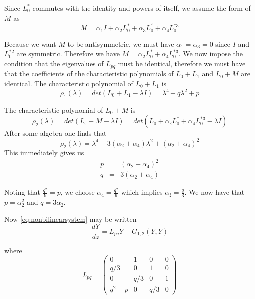 Since $L_0^*$ commutes with the identity and powers of itself, we assume the form of $M$ as
\begin{equation}
M = \alpha_1 I + \alpha_2 L_0^* + \alpha_3 L_0^{^2} + \alpha_4 L_0^{*3}
\end{equation}

Because we want $M$ to be antisymmetric, we must have $\alpha_1=\alpha_3=0$ since $I$ and $L_0^{*2}$ are symmetric.
Therefore we have $ M = \alpha_2 L_0^* + \alpha_4 L_0^{*3} $. We now impose the condition that the eigenvalues of $L_{pq}$
must be identical, therefore we must have that the coefficients of the characteristic polynomials of $L_0 + L_1$ and $L_0 + M $
are identical.
The characteristic polynomial of $L_0+L_1$ is 
\begin{equation}
\rho_1(\lambda) = det\left( L_0 + L_1 - \lambda I \right) = \lambda^4 - q \lambda^2 + p
\end{equation}


The characteristic polynomial of $L_0+M$ is 
\begin{equation}
\rho_2(\lambda) = det\left( L_0 + M - \lambda I \right) = det \left(L_0 + \alpha_2 L_0^* + \alpha_4 L_0^{*3} - \lambda I \right)
\end{equation}
After some algebra one finds that 
\begin{equation}
\rho_2(\lambda) = \lambda^4 - 3\left(\alpha_2+\alpha_4\right) \lambda^2 + \left(\alpha_2+\alpha_4\right)^2
\end{equation}
This immediately gives us
\begin{subequations}
\begin{eqnarray}
p &=& \left(\alpha_2+\alpha_4\right)^2\\
q &=& 3 \left(\alpha_2 + \alpha_4\right)
\end{eqnarray}
\end{subequations}


Noting that $\frac{q^2}{9} = p $, we choose $\alpha_4 = \frac{q^2}{9}$ which implies $\alpha_2 = \frac{q}{3} $. We 
now have that $p=\alpha_2^2$ and $q=3\alpha_2$.

Now \eqref{eq:nonbilinearsystem} may be written 
\begin{equation}\label{eq:bilinear}
\frac{ dY }{ dz } = L_{pq} Y - G_{1,2}(Y,Y)
\end{equation}

where 
\begin{equation}
L_{pq} = \left( 
\begin{array}{cccc}
0&1&0&0\\
q/3&0&1&0\\
0&q/3&0&1\\
q^2 - p &0&q/3&0 \end{array} \right)
 \end{equation}

